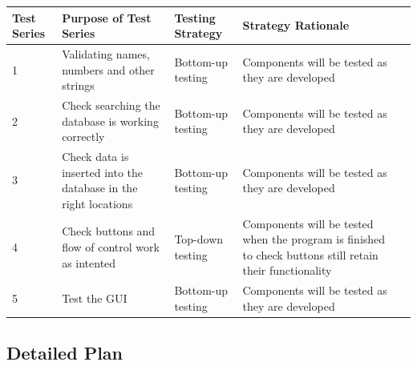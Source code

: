 {\begin{landscape}
\begin{center}
	\begin{tabular}{|p{2cm}|p{2cm}|p{2cm}|p{2cm}|l}
		\hline
		\textbf{Test Series}   & \textbf{Purpose of Test Series}   & \textbf{Testing Strategy}   & \textbf{Strategy Rationale} \\ \hline
		1  & Validating names, numbers and other strings  & Bottom-up testing  & Components will be tested as they are developed \\ \hline
		2  & Check searching the database is working correctly & Bottom-up testing  & Components will be tested as they are developed \\ \hline
		3  & Check data is inserted into the database in the right locations & Bottom-up testing  & Components will be tested as they are developed \\ \hline
		4  & Check buttons and flow of control work as intented & Top-down testing  & Components will be tested when the program is finished to check buttons still retain their functionality \\ \hline
		5  & Test the GUI & Bottom-up testing  & Components will be tested as they are developed \\ \hline
\end{tabular}
\end{center}

\subsection{Detailed Plan}


\end{landscape}}
